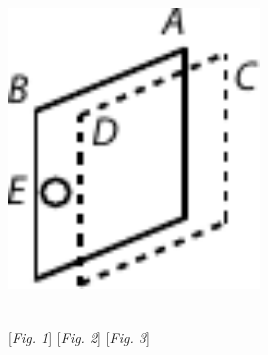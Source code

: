 \begin{minipage}[t]{0.33\textwidth}
\includegraphics[width=0.5\textwidth]{gesamttex/edit_VIII,3/images/LH_37_05_001_d3.pdf}
\end{minipage}
\newline
\\
\hspace*{11mm} [\textit{Fig. 1}]\label{LH_37_05_001r_Fig.1}\hspace{34mm} [\textit{Fig. 2}] \label{LH_37_05_001r_Fig.2}\hspace{36mm} [\textit{Fig. 3}] \label{LH_37_05_001r_Fig.3}
\pend
%
